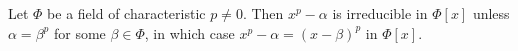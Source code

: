 Let $\Phi$ be a field of characteristic $p \neq 0$. Then $x^p - \alpha$ is irreducible in $\Phi[x]$ unless $\alpha = \beta^p$ for some $\beta \in \Phi$, in which case $x^p - \alpha = (x - \beta)^p$ in $\Phi[x]$.

